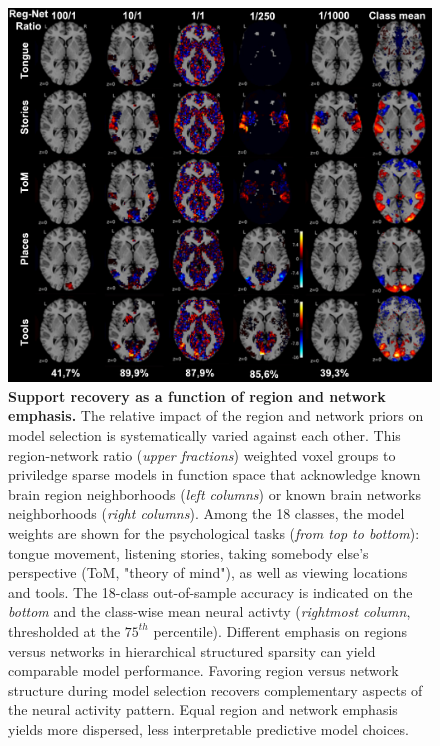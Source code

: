 \documentclass{article}
\begin{document}
\begin{figure}
\begin{centering}
\includegraphics[width=1.00\textwidth]{../figures/reg_net_ratio_colin.pdf}
\end{centering}
\vspace{-0.6cm}
\caption{\textbf{Support recovery as a function of
region and network emphasis.}
The relative impact of the region and network priors
on model selection
is systematically varied against each other.
This region-network ratio (\textit{upper fractions}) weighted voxel groups
to priviledge sparse models in function space
that acknowledge known brain region neighborhoods
(\textit{left columns}) or
known brain networks neighborhoods
(\textit{right columns}).
Among the 18 classes, the model weights are shown for the psychological
tasks (\textit{from top to bottom}): tongue movement, listening stories,
taking somebody else's perspective (ToM, "theory of mind"),
as well as
viewing locations and tools.
The 18-class out-of-sample accuracy is indicated
on the \textit{bottom} and
the class-wise mean neural activty
(\textit{rightmost column}, thresholded at the $75^{th}$ percentile).
%
Different emphasis on regions versus networks
in hierarchical structured sparsity can
yield comparable model performance.
%
Favoring region versus network structure during model selection
recovers complementary aspects of the neural activity pattern.
%
Equal region and network emphasis yields more dispersed,
less interpretable predictive model choices.
}
\label{fig_regnetratio}
\end{figure}
\end{document}
